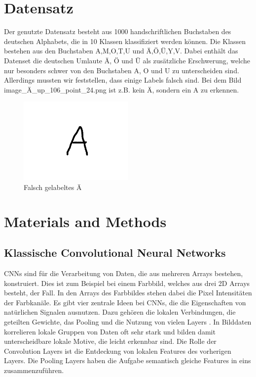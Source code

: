 \documentclass[runningheads,a4paper]{llncs}[2015/06/24]
\begin{document}
\section{Datensatz}\label{sec:dataset}
Der genutzte Datensatz besteht aus 1000 handschriftlichen Buchstaben des deutschen Alphabets, die in 10 Klassen klassifiziert werden können. 
Die Klassen bestehen aus den Buchstaben A,M,O,T,U und Ä,Ö,Ü,Y,V.
Dabei enthält das Datenset die deutschen Umlaute \"{A}, \"{O} und \"{U} als zusätzliche Erschwerung, welche nur besonders schwer von den Buchstaben A, O und U zu unterscheiden sind.
Allerdings mussten wir feststellen, dass einige Labels falsch sind. Bei dem Bild \glqq image\_Ä\_up\_106\_point\_24.png \grqq ist z.B. kein Ä, sondern ein A zu erkennen.
\begin{figure}
	\includegraphics[width=0.5\textwidth]{hand_images/image_Ae_up_106_point_24.png}
	\caption{Falsch gelabeltes Ä}
	\label{fig:wrong_labeled_image}
\end{figure}

\section{Materials and Methods}\label{sec:material}

\subsection{Klassische Convolutional Neural Networks}
CNNs sind für die Verarbeitung von Daten, die aus mehreren Arrays bestehen, konstruiert. Dies ist zum Beispiel bei einem Farbbild, welches aus drei 2D Arrays besteht, der Fall. In den Arrays des Farbbildes stehen dabei die Pixel Intensitäten der Farbkanäle. Es gibt vier zentrale Ideen bei CNNs, die die Eigenschaften von natürlichen Signalen ausnutzen. Dazu gehören die lokalen Verbindungen, die geteilten Gewichte, das Pooling und die Nutzung von vielen Layers \cite{lecun_nature}. In Bilddaten korrelieren lokale Gruppen von Daten oft sehr stark und bilden damit unterscheidbare lokale Motive, die leicht erkennbar sind. Die Rolle der Convolution Layers ist die Entdeckung von lokalen Features des vorherigen Layers. Die Pooling Layers haben die Aufgabe semantisch gleiche Features in eins zusammenzuführen.
\end{document}
